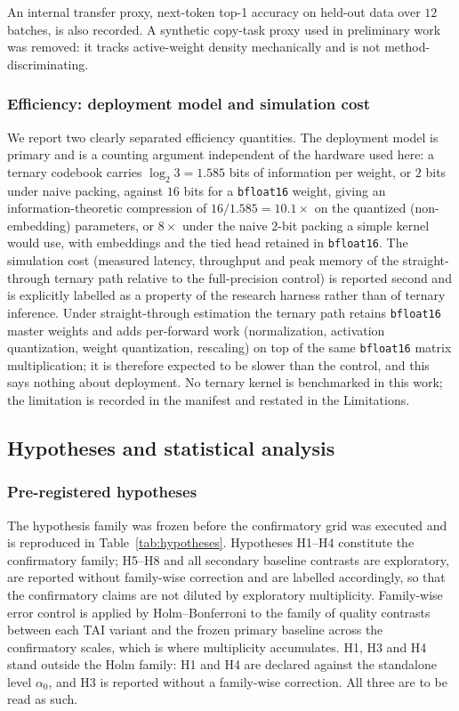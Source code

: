 \documentclass[final,5p,times,twocolumn]{elsarticle}
\theoremstyle{remark}
\begin{document}
An internal transfer proxy, next-token top-1 accuracy on held-out data over
$12$ batches, is also recorded. A synthetic copy-task proxy used in preliminary
work was removed: it tracks active-weight density mechanically and is not
method-discriminating.

\subsubsection{Efficiency: deployment model and simulation cost}

We report two clearly separated efficiency quantities. The deployment
model is primary and is a counting argument independent of the hardware used
here: a ternary codebook carries $\log_{2} 3 = 1.585$ bits of information per
weight, or $2$ bits under naive packing, against $16$ bits for a \texttt{bfloat16} weight,
giving an information-theoretic compression of $16/1.585 = 10.1\times$ on the
quantized (non-embedding) parameters, or $8\times$ under the naive $2$-bit
packing a simple kernel would use, with embeddings and the tied head
retained in \texttt{bfloat16}. The simulation cost (measured latency,
throughput and peak memory of the straight-through ternary path relative to the
full-precision control) is reported second and is explicitly labelled as a
property of the research harness rather than of ternary inference. Under
straight-through estimation the ternary path retains \texttt{bfloat16} master
weights and adds per-forward work (normalization, activation
quantization, weight quantization, rescaling) on top of the same
\texttt{bfloat16} matrix multiplication; it is therefore expected to be slower
than the control, and this says nothing about deployment. No ternary kernel is benchmarked in this work; the limitation is
recorded in the manifest and restated in the Limitations.

\subsection{Hypotheses and statistical analysis}
\label{sec:stats}

\subsubsection{Pre-registered hypotheses}

The hypothesis family was frozen before the confirmatory grid was executed and
is reproduced in Table~\ref{tab:hypotheses}. Hypotheses H1--H4 constitute the
confirmatory family; H5--H8 and all secondary baseline contrasts are
exploratory, are reported without family-wise correction and are labelled
accordingly, so that the confirmatory claims are not diluted by exploratory
multiplicity. Family-wise error control is applied by Holm--Bonferroni to the
family of quality contrasts between each TAI variant and the frozen primary
baseline across the confirmatory scales, which is where multiplicity
accumulates. H1, H3 and H4 stand outside the Holm family: H1 and H4 are declared against
the standalone level $\alpha_{0}$, and H3 is reported without a family-wise
correction. All three are to be read as such.
\end{document}
